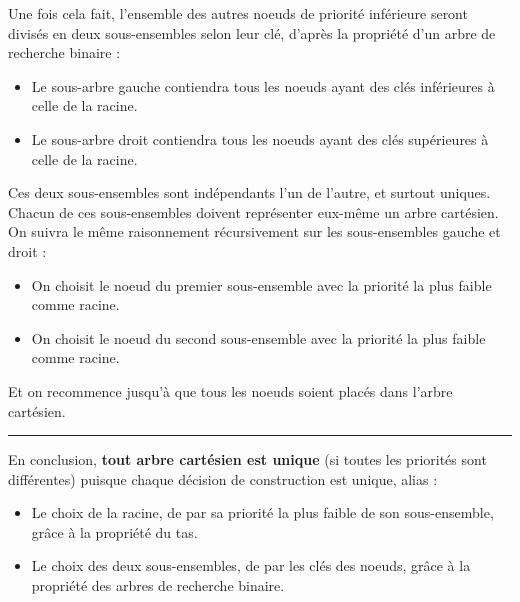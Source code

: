 \documentclass[a4paper,12pt]{report}
\begin{document}
\begin{tcolorbox}[colback=gray!10, colframe=blue!30, coltitle=black, title=Réponse à la 1.a - 2/2]


    Une fois cela fait, l'ensemble des autres noeuds de priorité inférieure seront divisés en deux sous-ensembles selon leur clé, d'après la propriété d'un 
        arbre de recherche binaire :\\[-0.4cm]
    \begin{itemize}
        \item Le sous-arbre gauche contiendra tous les noeuds ayant des clés inférieures à celle de la racine.
        \item Le sous-arbre droit contiendra tous les noeuds ayant des clés supérieures à celle de la racine.
    \end{itemize}


    \vspace{0.5cm}

    Ces deux sous-ensembles sont indépendants l'un de l'autre, et surtout uniques. Chacun de ces sous-ensembles doivent représenter eux-même un arbre cartésien.\\

    On suivra le même raisonnement récursivement sur les sous-ensembles gauche et droit :\\[-0.4cm]
    \begin{itemize}
        \item On choisit le noeud du premier sous-ensemble avec la priorité la plus faible comme racine.
        \item On choisit le noeud du second sous-ensemble avec la priorité la plus faible comme racine.
    \end{itemize}

    \vspace{0.5cm}

    Et on recommence jusqu'à que tous les noeuds soient placés dans l'arbre cartésien.


    \vspace{0.5cm}
    \hrule
    \vspace{0.5cm}


    En conclusion, \textbf{tout arbre cartésien est unique} (si toutes les priorités sont différentes) puisque chaque décision de construction 
        est unique, alias :\\[-0.4cm]
    \begin{itemize}
        \item Le choix de la racine, de par sa priorité la plus faible de son sous-ensemble, grâce à la propriété du tas.
        \item Le choix des deux sous-ensembles, de par les clés des noeuds, grâce à la propriété des arbres de recherche binaire. 
    \end{itemize}

\end{tcolorbox}
\end{document}
